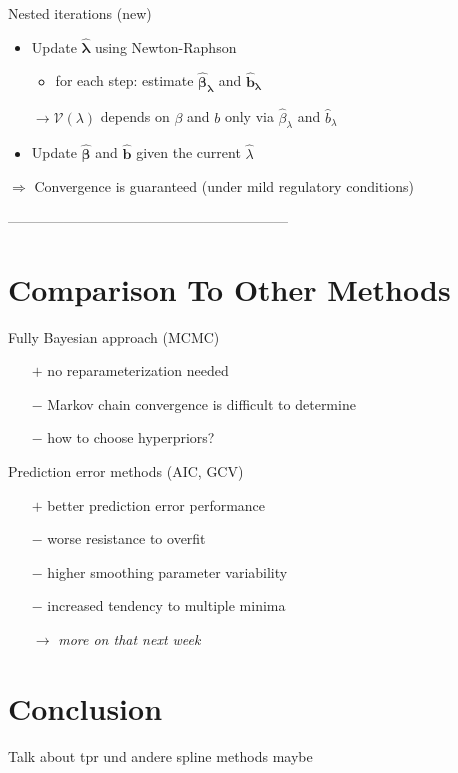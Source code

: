 \documentclass[12pt]{article}
\begin{document}
Nested iterations (new)
\begin{itemize}
\item Update $\boldsymbol{\hat{\lambda}}$ using Newton-Raphson

\begin{itemize}
\item for each step: estimate $\boldsymbol{\hat{\beta}_\lambda}$ and $\boldsymbol{\hat{b}_\lambda}$
\end{itemize}


$\rightarrow \mathcal{V}(\lambda)$ depends on $\beta$ and $b$ only via $\hat{\beta}_\lambda$ and $\hat{b}_\lambda$

\item Update $\boldsymbol{\hat{\beta}}$ and $\boldsymbol{\hat{b}}$ given the current $\hat{\lambda}$

\end{itemize}
$\Rightarrow$ Convergence is guaranteed (under mild regulatory conditions)


------------------------------------------------------------




\section{Comparison To Other Methods} %


Fully Bayesian approach (MCMC)
\begin{itemize}
\item[$+$] no reparameterization needed
\item[$-$] Markov chain convergence is difficult to determine
\item[$-$] how to choose hyperpriors?
\end{itemize}

Prediction error methods (AIC, GCV)
\begin{itemize}
\item[$+$] better prediction error performance 
\item[$-$] worse resistance to overfit
\item[$-$] higher smoothing parameter variability
\item[$-$] increased tendency to multiple minima
\item[$\rightarrow$] \textit{more on that next week}
\end{itemize}


\section{Conclusion} %
Talk about tpr und andere spline methods maybe
\end{document}
